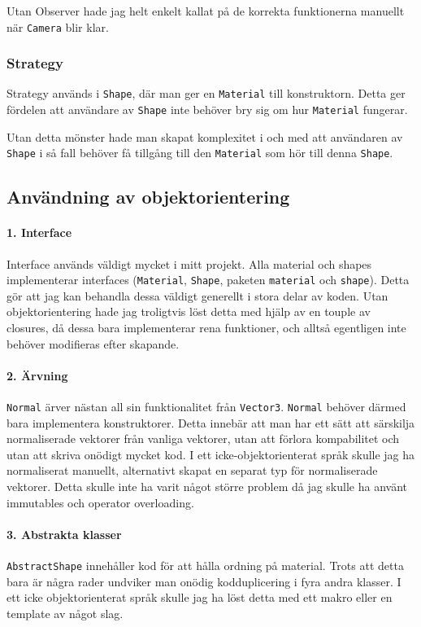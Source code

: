 \documentclass{article}
\begin{document}
Utan Observer hade jag helt enkelt kallat på de korrekta funktionerna
manuellt när \texttt{Camera} blir klar.

\subsubsection{Strategy}
Strategy används i \texttt{Shape}, där man ger en \texttt{Material}
till konstruktorn.  Detta ger fördelen att användare av \texttt{Shape}
inte behöver bry sig om hur \texttt{Material} fungerar.

Utan detta mönster hade man skapat komplexitet i och med att
användaren av \texttt{Shape} i så fall behöver få tillgång till den
\texttt{Material} som hör till denna \texttt{Shape}.


\subsection{Användning av objektorientering}
\paragraph{1. Interface}
Interface används väldigt mycket i mitt projekt. Alla material och
shapes implementerar interfaces (\texttt{Material}, \texttt{Shape},
paketen \texttt{material} och \texttt{shape}). Detta gör att jag kan
behandla dessa väldigt generellt i stora delar av koden. Utan
objektorientering hade jag troligtvis löst detta med hjälp av en
touple av closures, då dessa bara implementerar rena funktioner, och
alltså egentligen inte behöver modifieras efter skapande.

\paragraph{2. Ärvning}
\texttt{Normal} ärver nästan all sin funktionalitet från
\texttt{Vector3}. \texttt{Normal} behöver därmed bara implementera
konstruktorer. Detta innebär att man har ett sätt att särskilja
normaliserade vektorer från vanliga vektorer, utan att förlora
kompabilitet och utan att skriva onödigt mycket kod. I ett
icke-objektorienterat språk skulle jag ha normaliserat manuellt,
alternativt skapat en separat typ för normaliserade vektorer. Detta
skulle inte ha varit något större problem då jag skulle ha använt
immutables och operator overloading.

\paragraph{3. Abstrakta klasser}
\texttt{AbstractShape} innehåller kod för att hålla ordning på
material. Trots att detta bara är några rader undviker man onödig
kodduplicering i fyra andra klasser. I ett icke objektorienterat språk
skulle jag ha löst detta med ett makro eller en template av något
slag.
\end{document}
